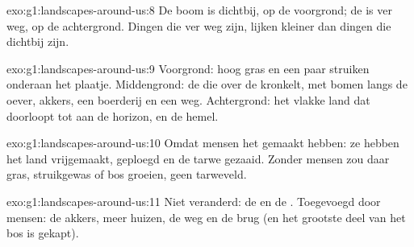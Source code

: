 \begin{solution}{exo:g1:landscapes-around-us:8}
De boom is dichtbij, op de voorgrond; de  is ver weg, op de
achtergrond. Dingen die ver weg zijn, lijken kleiner dan dingen die
dichtbij zijn.
\end{solution}

\begin{solution}{exo:g1:landscapes-around-us:9}
Voorgrond: hoog gras en een paar struiken onderaan het plaatje.
Middengrond: de  die over de  kronkelt, met bomen langs de
oever, akkers, een boerderij en een weg.
Achtergrond: het vlakke land dat doorloopt tot aan de horizon, en de hemel.
\end{solution}

\begin{solution}{exo:g1:landscapes-around-us:10}
Omdat mensen het gemaakt hebben: ze hebben het land vrijgemaakt, geploegd
en de tarwe gezaaid. Zonder mensen zou daar gras, struikgewas of bos
groeien, geen tarweveld.
\end{solution}

\begin{solution}{exo:g1:landscapes-around-us:11}
Niet veranderd: de  en de . Toegevoegd door mensen: de akkers,
meer huizen, de weg en de brug (en het grootste deel van het bos is gekapt).
\end{solution}
